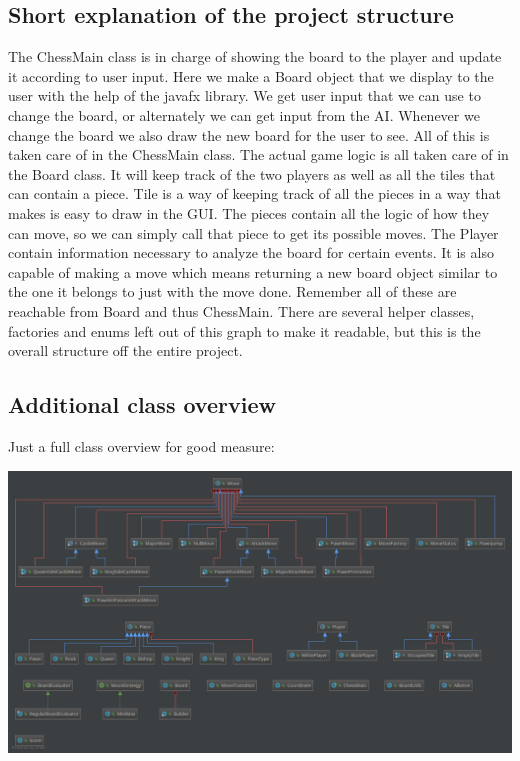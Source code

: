 \documentclass{article}
\begin{document}
    \subsection{Short explanation of the project structure}
    The ChessMain class is in charge of showing the board to the player and update it according to user input.
	Here we make a Board object that we display to the user with the help of the javafx library.
	We get user input that we can use to change the board, or alternately we can get input from the AI.
	Whenever we change the board we also draw the new board for the user to see. 
	All of this is taken care of in the ChessMain class.
	The actual game logic is all taken care of in the Board class.
	It will keep track of the two players as well as all the tiles that can contain a piece.
	Tile is a way of keeping track of all the pieces in a way that makes is easy to draw in the GUI.
	The pieces contain all the logic of how they can move,
	so we can simply call that piece to get its possible moves.
	The Player contain information necessary to analyze the board for certain events.
	It is also capable of making a move 
	which means returning a new board object similar to the one it belongs to just with the move done.
	Remember all of these are reachable from Board and thus ChessMain.
    There are several helper classes, factories and enums left out of this graph to make it readable, but this is the overall structure off the entire project.
    
    \subsection{Additional class overview}
    Just a full class overview for good measure:
    \begin{center}
    \includegraphics[scale=0.3]{extra-class-overview.png}
    \end{center}
    
    
\end{document}
